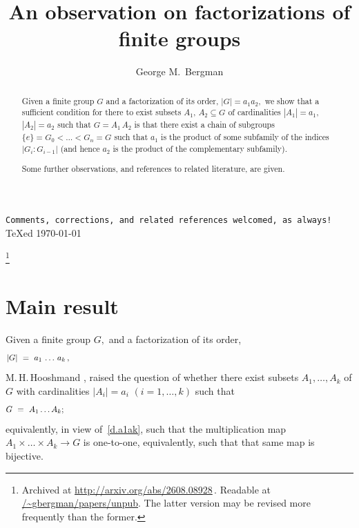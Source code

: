 \documentclass{amsart}
\numberwithin{equation}{section}
\numberwithin{theorem}{section}
\begin{document}
\begin{center}
\texttt{Comments, corrections,
and related references welcomed, as always!}\\[.5em]
{\TeX}ed \today
\\[.5em]
\vspace{2em}
\end{center}

\title%
{An observation on factorizations of finite groups}
\thanks{%
Archived at \url{http://arxiv.org/abs/2608.08928}\,.
Readable
at \url{/~gbergman/papers/unpub}.
The latter version may be revised more frequently than the former.
%
%
}


\author{George M.\ Bergman}
\address{Department of Mathematics\\
University of California\\
Berkeley, CA 94720-3840, USA}

\begin{abstract}
Given a finite group $G$ and a factorization of its order,
$|G|= a_1 a_2,$ we show that a sufficient condition for
there to exist subsets $A_1,\,A_2\subseteq G$ of
cardinalities $|A_1| = a_1,$ $|A_2| = a_2$ such that
$G = A_1\,A_2$ is that there exist a chain of subgroups
$\{e\} = G_0 < \dots < G_n = G$ such that $a_1$ is the
product of some subfamily of the indices $|G_i:G_{i-1}|$
(and hence $a_2$ is the product of the complementary subfamily).

Some further observations, and references to
related literature, are given.
\end{abstract}
\maketitle

\section{Main result}\label{S.main}

Given a finite group $G,$ and a factorization of its order,
%
\begin{equation}\begin{minipage}[c]{35pc}\label{d.a1ak}
$|G|\ =\ a_1\,\dots\,a_k\,,$
\end{minipage}\end{equation}
%
M.\,H.\,Hooshmand \cite{MHH_overflow}, \cite{MHH_factor}
raised the question of whether there
exist subsets $A_1,\dots,A_k$ of $G$ with cardinalities
$|A_i| = a_i$ $(i=1,\dots,k)$ such that
%
\begin{equation}\begin{minipage}[c]{35pc}\label{d.A1Ak}
$G\ =\ A_1\dots A_k$;
\end{minipage}\end{equation}
%
equivalently, in view of~\eqref{d.a1ak}, such that
the multiplication map $A_1\times\dots\times A_k\to G$
is one-to-one, equivalently, such that %
that same map is bijective.
\end{document}
